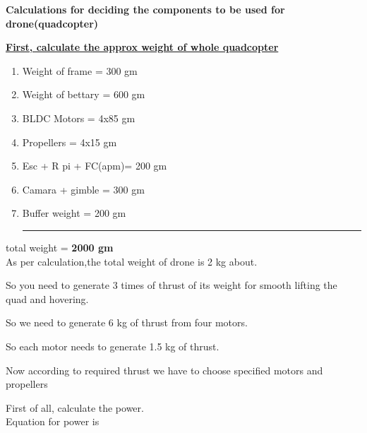 \documentclass{article}
\begin{document}
 	\begin{center}
 		{
 			\huge \textbf{ Calculations for deciding the components to be used for drone(quadcopter)}
 		}
 	\end{center}
 	\begin{flushleft}
 	\vspace{0.5in}
 	\large
 	
 \textbf{\underline{	First, calculate the approx weight of whole quadcopter}}
 	\begin{enumerate}
 		\item	Weight of frame 	 =	  300 gm
 		\item Weight of bettary	 = 	  600 gm
 		\item BLDC Motors 	= 	  4x85 gm
 		\item 	 Propellers 		= 	  4x15 gm
 		\item	Esc + R pi + FC(apm)= 	  200 gm
	 	\item	Camara + gimble 	= 	  300 gm
 		\item	Buffer weight	=           200 gm
		\hrule
 		
 	\end{enumerate}
 \hspace{0.2in}	total weight = \textbf{2000 gm}  \newline
	 \\
 	As per calculation,the  total weight of drone is 2 kg about.\newline
 	
 	 So you need to generate 3 times of thrust of its weight for smooth lifting the quad and hovering.\newline
 	 
 	So we need to generate 6 kg of thrust from four motors.\newline
 	
 	So each motor needs to generate 1.5 kg of thrust.\newline
 	
 	Now according to required thrust we have to choose specified motors and propellers\newline
 	
 	First of all, calculate the power.\\
 	Equation for power is 
 	
 \end{flushleft}
 \begin{center}
 	
 	\mathbf {\[ Power = propller’s constant * (R.P.M.)^{power factor} \]}
 \end{center}
\end{document}
